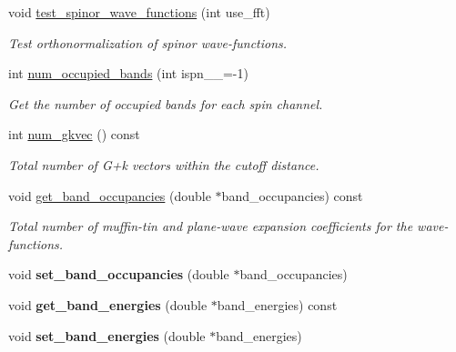 \begin{DoxyCompactItemize}
\item 
void \hyperlink{classsirius_1_1_k__point_a66c57595d6fe6527fc46911118aae4be}{test\+\_\+spinor\+\_\+wave\+\_\+functions} (int use\+\_\+fft)
\begin{DoxyCompactList}\small\item\em Test orthonormalization of spinor wave-\/functions. \end{DoxyCompactList}\item 
int \hyperlink{classsirius_1_1_k__point_a96cb8a5ecb6def0d01b451dd426feee3}{num\+\_\+occupied\+\_\+bands} (int ispn\+\_\+\+\_\+=-\/1)
\begin{DoxyCompactList}\small\item\em Get the number of occupied bands for each spin channel. \end{DoxyCompactList}\item 
int \hyperlink{classsirius_1_1_k__point_a938e93b58344f86808911fa7eeb34c69}{num\+\_\+gkvec} () const 
\begin{DoxyCompactList}\small\item\em Total number of G+k vectors within the cutoff distance. \end{DoxyCompactList}\item 
void \hyperlink{classsirius_1_1_k__point_aa0bace30028bc0153dd10758e3266b22}{get\+\_\+band\+\_\+occupancies} (double $\ast$band\+\_\+occupancies) const 
\begin{DoxyCompactList}\small\item\em Total number of muffin-\/tin and plane-\/wave expansion coefficients for the wave-\/functions. \end{DoxyCompactList}\item 
\hypertarget{classsirius_1_1_k__point_ace6adc86c210d2dc51cf2d867417750a}{}void {\bfseries set\+\_\+band\+\_\+occupancies} (double $\ast$band\+\_\+occupancies)\label{classsirius_1_1_k__point_ace6adc86c210d2dc51cf2d867417750a}

\item 
\hypertarget{classsirius_1_1_k__point_a5f24692ae4559abe084bcb21b8f43163}{}void {\bfseries get\+\_\+band\+\_\+energies} (double $\ast$band\+\_\+energies) const \label{classsirius_1_1_k__point_a5f24692ae4559abe084bcb21b8f43163}

\item 
\hypertarget{classsirius_1_1_k__point_aaa2bb3467c7d102a9b827775de6e889b}{}void {\bfseries set\+\_\+band\+\_\+energies} (double $\ast$band\+\_\+energies)\label{classsirius_1_1_k__point_aaa2bb3467c7d102a9b827775de6e889b}


\end{DoxyCompactItemize}
